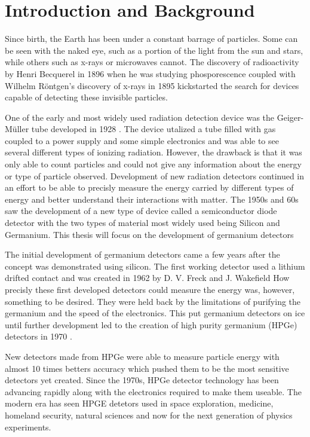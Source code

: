 \chapter{Introduction and Background}

Since birth, the Earth has been under a constant barrage of particles.
Some can be seen with the naked eye, such as a portion of the light from the sun and stars, while others such as x-rays or microwaves cannot.
The discovery of radioactivity by Henri Becquerel in 1896 when he was studying phosporescence \cite{Mould} coupled with Wilhelm R{\"o}ntgen's discovery of x-rays in 1895 \cite{wilhelm} kickstarted the search for devices capable of detecting these invisible particles.

One of the early and most widely used radiation detection device was the Geiger-M{\"u}ller tube developed in 1928 \cite{geiger}.
The device utalized a tube filled with gas coupled to a power supply and some simple electronics and was able to see several different types of ionizing radiation.
However, the drawback is that it was only able to count particles and could not give any information about the energy or type of particle observed.
Development of new radiation detectors continued in an effort to be able to precisly measure the energy carried by different types of energy and better understand their interactions with matter.
The 1950s and 60s saw the development of a new type of device called a semiconductor diode detector with the two types of material most widely used being Silicon and Germanium.
This thesis will focus on the development of germanium detectors

The initial development of germanium detectors came a few years after the concept was demonstrated using silicon.
The first working detector used a lithium drifted contact and was created in 1962 by D. V. Freck and J. Wakefield \cite{1962Natur}
How precisly these first developed detectors could measure the energy was, however, something to be desired.
They were held back by the limitations of purifying the germanium and the speed of the electronics.
This put germanium detectors on ice until further development led to the creation of high purity germanium (HPGe) detectors in 1970 \cite{Baertsch1970,Tavendale1970}.

New detectors made from HPGe were able to measure particle energy with almost 10 times betters accuracy which pushed them to be the most sensitive detectors yet created.
Since the 1970s, HPGe detector technology has been advancing rapidly along with the electronics required to make them useable.
The modern era has seen HPGE detetors used in space exploration, medicine, homeland security, natural sciences and now for the next generation of physics experiments.

